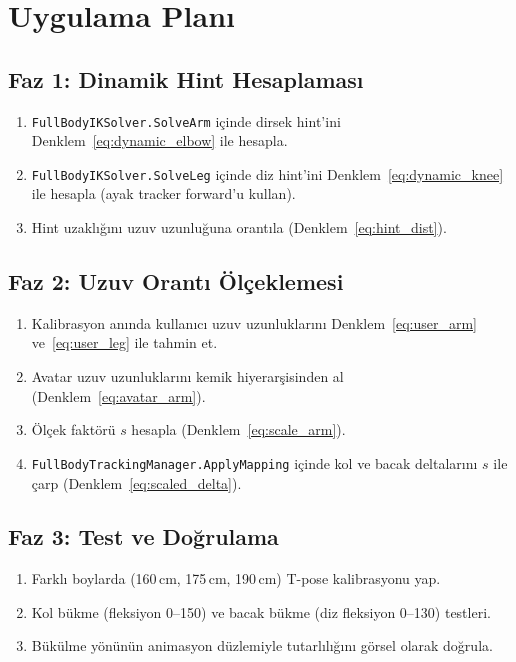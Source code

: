 \documentclass[11pt,a4paper]{article}
\begin{document}
\section{Uygulama Plan{\i}}
\label{sec:plan}

\subsection{Faz 1: Dinamik Hint Hesaplamas{\i}}
\begin{enumerate}[nosep]
    \item \texttt{FullBodyIKSolver.SolveArm} i\c{c}inde dirsek hint'ini
          Denklem~\ref{eq:dynamic_elbow} ile hesapla.
    \item \texttt{FullBodyIKSolver.SolveLeg} i\c{c}inde diz hint'ini
          Denklem~\ref{eq:dynamic_knee} ile hesapla (ayak tracker forward'u kullan).
    \item Hint uzakl{\i}\u{g}{\i}n{\i} uzuv uzunlu\u{g}una orant{\i}la
          (Denklem~\ref{eq:hint_dist}).
\end{enumerate}

\subsection{Faz 2: Uzuv Orant{\i} \"Ol\c{c}eklemesi}
\begin{enumerate}[nosep]
    \item Kalibrasyon an{\i}nda kullan{\i}c{\i} uzuv uzunluklar{\i}n{\i}
          Denklem~\ref{eq:user_arm} ve~\ref{eq:user_leg} ile tahmin et.
    \item Avatar uzuv uzunluklar{\i}n{\i} kemik hiyerar\c{s}isinden al
          (Denklem~\ref{eq:avatar_arm}).
    \item \"Ol\c{c}ek fakt\"or\"u $s$ hesapla (Denklem~\ref{eq:scale_arm}).
    \item \texttt{FullBodyTrackingManager.ApplyMapping} i\c{c}inde kol ve
          bacak deltalar{\i}n{\i} $s$ ile \c{c}arp
          (Denklem~\ref{eq:scaled_delta}).
\end{enumerate}

\subsection{Faz 3: Test ve Do\u{g}rulama}
\begin{enumerate}[nosep]
    \item Farkl{\i} boylarda (160\,cm, 175\,cm, 190\,cm) T-pose kalibrasyonu yap.
    \item Kol b\"ukme (fleksiyon 0--150\degree) ve bacak b\"ukme
          (diz fleksiyon 0--130\degree) testleri.
    \item B\"uk\"ulme y\"on\"un\"un animasyon d\"uzlemiyle tutarl{\i}l{\i}\u{g}{\i}n{\i}
          g\"orsel olarak do\u{g}rula.
\end{enumerate}
\end{document}
